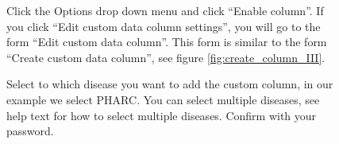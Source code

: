 \begin{figure}[ht]
  \begin{shaded}
		\caption{Click the Options drop down menu and click ``Enable column''. 
		If you click ``Edit custom data column settings'', you will go to the form ``Edit custom data column''. 
		This form is similar to the form ``Create custom data column'', see figure \ref{fig:create_column_III}.}
    \label{fig:manage_column_III}
  \end{shaded}
\end{figure}

\begin{figure}[ht]
  \begin{shaded}
  	\caption{Select to which disease you want to add the custom column, in our example we select PHARC. 
  	You can select multiple diseases, see help text for how to select multiple diseases.\newline
  	Confirm with your password.}
  \label{fig:manage_column_IV}
  \end{shaded}
\end{figure}

